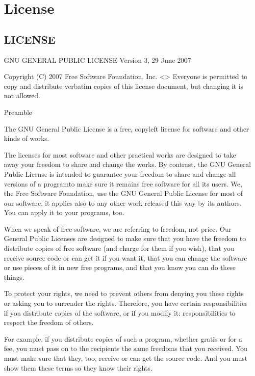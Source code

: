 \documentclass[letterpaper,10pt,english]{sphinxmanual}
\begin{document}
\section{License}
\label{\detokenize{index:license}}

\subsection{LICENSE}
\label{\detokenize{content/misc/LICENSE:license}}\label{\detokenize{content/misc/LICENSE::doc}}
GNU GENERAL PUBLIC LICENSE
Version 3, 29 June 2007

Copyright (C) 2007 Free Software Foundation, Inc. \textless{}\textgreater{}
Everyone is permitted to copy and distribute verbatim copies
of this license document, but changing it is not allowed.

Preamble

The GNU General Public License is a free, copyleft license for
software and other kinds of works.

The licenses for most software and other practical works are designed
to take away your freedom to share and change the works.  By contrast,
the GNU General Public License is intended to guarantee your freedom to
share and change all versions of a program\textendash{}to make sure it remains free
software for all its users.  We, the Free Software Foundation, use the
GNU General Public License for most of our software; it applies also to
any other work released this way by its authors.  You can apply it to
your programs, too.

When we speak of free software, we are referring to freedom, not
price.  Our General Public Licenses are designed to make sure that you
have the freedom to distribute copies of free software (and charge for
them if you wish), that you receive source code or can get it if you
want it, that you can change the software or use pieces of it in new
free programs, and that you know you can do these things.

To protect your rights, we need to prevent others from denying you
these rights or asking you to surrender the rights.  Therefore, you have
certain responsibilities if you distribute copies of the software, or if
you modify it: responsibilities to respect the freedom of others.

For example, if you distribute copies of such a program, whether
gratis or for a fee, you must pass on to the recipients the same
freedoms that you received.  You must make sure that they, too, receive
or can get the source code.  And you must show them these terms so they
know their rights.
\end{document}
